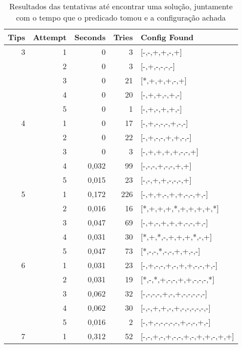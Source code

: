 \begin{table}[htbp]
  \centering
  \caption{Resultados das tentativas até encontrar uma solução, juntamente com o tempo que o predicado tomou e a configuração achada}
    \begin{tabular}{rrrrl}
    \hline
    \multicolumn{1}{l}{Tips} & \multicolumn{1}{l}{Attempt} & \multicolumn{1}{l}{Seconds} & \multicolumn{1}{l}{Tries} & Config Found \\ \hline\hline
    3     & 1     & 0     & 3     & [-,-,+,+,-,+] \\
          & 2     & 0     & 3     & [-,+,-,-,-,-] \\
          & 3     & 0     & 21    & [*,+,+,+,-,+] \\
          & 4     & 0     & 20    & [-,+,+,-,+,-] \\
          & 5     & 0     & 1     & [-,+,-,+,+,-] \\
    4     & 1     & 0     & 17    & [-,+,-,-,-,+,-,-] \\
          & 2     & 0     & 22    & [-,+,-,-,+,+,-,-] \\
          & 3     & 0     & 3     & [-,+,+,+,+,-,-,+] \\
          & 4     & 0,032 & 99    & [-,-,-,+,-,-,+,+] \\
          & 5     & 0,015 & 23    & [-,-,+,+,-,-,-,+] \\
    5     & 1     & 0,172 & 226   & [-,+,+,-,+,+,-,-,+,-] \\
          & 2     & 0,016 & 16    & [*,+,+,+,*,+,+,+,+,*] \\
          & 3     & 0,047 & 69    & [-,+,-,+,+,+,-,-,+,-] \\
          & 4     & 0,031 & 30    & [*,+,*,-,+,+,+,*,-,+] \\
          & 5     & 0,047 & 73    & [*,-,-,*,-,-,+,+,-,-] \\
    6     & 1     & 0,031 & 23    & [-,+,-,-,+,-,+,+,-,-,+,-] \\
          & 2     & 0,031 & 19    & [*,-,*,+,-,-,+,+,-,-,-,*] \\
          & 3     & 0,062 & 32    & [-,-,-,-,+,-,+,-,-,-,-,-] \\
          & 4     & 0,062 & 30    & [-,-,+,+,-,+,-,-,-,-,-,-] \\
          & 5     & 0,016 & 2     & [-,+,-,-,-,-,-,+,-,-,+,-] \\
    7     & 1     & 0,312 & 52    & [-,-,+,-,+,-,-,+,-,+,+,-,+,+] \\

\end{tabular}
\end{table}
